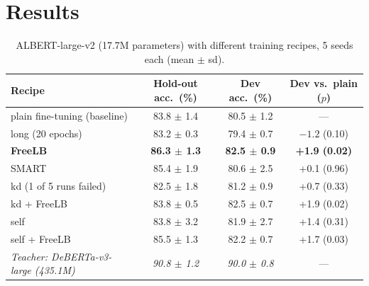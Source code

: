 \documentclass[11pt]{article}
\begin{document}
\section{Results}

\begin{table}[h]
\centering\small
\caption{ALBERT-large-v2 (17.7M parameters) with different training recipes, 5 seeds each (mean $\pm$ sd).}
\label{tab:recipes}
\begin{tabular}{lccc}
\toprule
Recipe & Hold-out acc.\ (\%) & Dev acc.\ (\%) & Dev vs.\ plain ($p$) \\
\midrule
plain fine-tuning (baseline) & 83.8 $\pm$ 1.4 & 80.5 $\pm$ 1.2 & --- \\
long (20 epochs)             & 83.2 $\pm$ 0.3 & 79.4 $\pm$ 0.7 & $-1.2$ (0.10) \\
\textbf{FreeLB}              & \textbf{86.3 $\pm$ 1.3} & \textbf{82.5 $\pm$ 0.9} & \textbf{+1.9 (0.02)} \\
SMART                        & 85.4 $\pm$ 1.9 & 80.6 $\pm$ 2.5 & +0.1 (0.96) \\
kd (1 of 5 runs failed)      & 82.5 $\pm$ 1.8 & 81.2 $\pm$ 0.9 & +0.7 (0.33) \\
kd + FreeLB                  & 83.8 $\pm$ 0.5 & 82.5 $\pm$ 0.7 & +1.9 (0.02) \\
self                         & 83.8 $\pm$ 3.2 & 81.9 $\pm$ 2.7 & +1.4 (0.31) \\
self + FreeLB                & 85.5 $\pm$ 1.3 & 82.2 $\pm$ 0.7 & +1.7 (0.03) \\
\midrule
\textit{Teacher: DeBERTa-v3-large (435.1M)} & \textit{90.8 $\pm$ 1.2} & \textit{90.0 $\pm$ 0.8} & --- \\
\bottomrule
\end{tabular}
\end{table}
\end{document}
